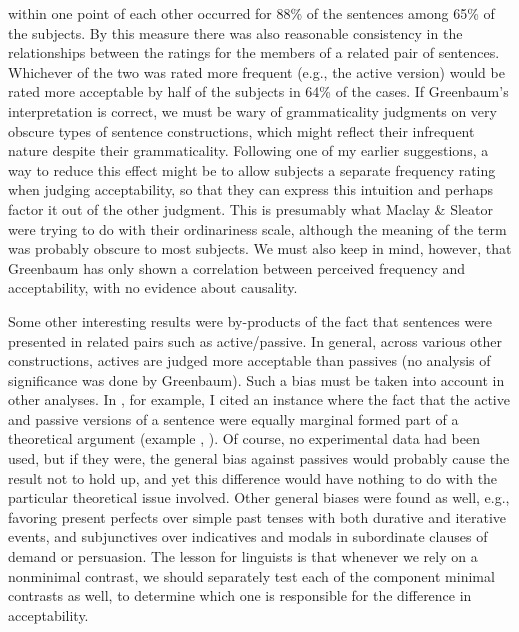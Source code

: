 within one point of each other occurred for 88\% of the sentences among 65\% of the subjects. By this measure there was also reasonable consistency in the relationships between the ratings for the members of a related pair of sentences. Whichever of the two was rated more frequent (e.g., the active version) would be rated more acceptable by half of the subjects in 64\% of the cases. If Greenbaum's interpretation is correct, we must be wary of grammaticality judgments on very obscure types of sentence constructions, which might reflect their infrequent nature despite their grammaticality. Following one of my earlier suggestions, a way to reduce this effect might be to allow subjects a separate frequency rating when judging acceptability, so that they can express this intuition and perhaps factor it out of the other judgment. This is presumably what Maclay \& Sleator were trying to do with their ordinariness scale, although the meaning of the term was probably obscure to most subjects. We must also keep in mind, however, that Greenbaum has only shown a correlation between perceived frequency and acceptability, with no evidence about causality.

Some other interesting results were by-products of the fact that sentences were presented in related pairs such as active/passive. In general, across various other constructions, actives are judged more acceptable than passives (no analysis of significance was done by Greenbaum). Such a bias must be taken into account in other analyses. In , for example, I cited an instance where the fact that the active and passive versions of a sentence were equally marginal formed part of a theoretical argument (example , ). Of course, no experimental data had been used, but if they were, the general bias against passives would probably cause the result not to hold up, and yet this difference would have nothing to do with the particular theoretical issue involved. Other general biases were found as well, e.g., favoring present perfects over simple past tenses with both durative and iterative events, and subjunctives over indicatives and modals in subordinate clauses of demand or persuasion. The lesson for linguists is that whenever we rely on a nonminimal contrast, we should separately test each of the component minimal contrasts as well, to determine which one is responsible for the difference in acceptability.

